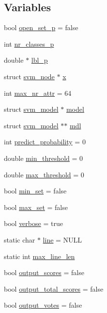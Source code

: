 \subsection*{Variables}
\begin{DoxyCompactItemize}
\item 
bool \hyperlink{svm-predict-old_8cpp_af292311da2955e8e2dd274443d57ee3a}{open\-\_\-set\-\_\-p} = false
\item 
int \hyperlink{svm-predict-old_8cpp_a7f5f60f72ac3c9c0dfe1c1873dff770f}{nr\-\_\-classes\-\_\-p}
\item 
double $\ast$ \hyperlink{svm-predict-old_8cpp_a34e7d19a381f7dfe28c6de7f93295bbc}{lbl\-\_\-p}
\item 
struct \hyperlink{structsvm__node}{svm\-\_\-node} $\ast$ \hyperlink{svm-predict-old_8cpp_a9a5b72a4065074cac5da07efb80a1e79}{x}
\item 
int \hyperlink{svm-predict-old_8cpp_af95bde9162db2c5dd97e80795b3548ed}{max\-\_\-nr\-\_\-attr} = 64
\item 
struct \hyperlink{structsvm__model}{svm\-\_\-model} $\ast$ \hyperlink{svm-predict-old_8cpp_a50c87b127b14787341e9630f4f5c700a}{model}
\item 
struct \hyperlink{structsvm__model}{svm\-\_\-model} $\ast$$\ast$ \hyperlink{svm-predict-old_8cpp_a639aa8f86cbf6b9c5d43e0c5082e26ac}{mdl}
\item 
int \hyperlink{svm-predict-old_8cpp_a1501132f5226b295e5300d74da55a2b9}{predict\-\_\-probability} = 0
\item 
double \hyperlink{svm-predict-old_8cpp_a3670388207cf8d0f4f4c9237a1482057}{min\-\_\-threshold} = 0
\item 
double \hyperlink{svm-predict-old_8cpp_a9090dc0b930a5f9212a3b6f3e4b5c5ab}{max\-\_\-threshold} = 0
\item 
bool \hyperlink{svm-predict-old_8cpp_aa816fb83dd1b415e1339bb8ddd6cdabc}{min\-\_\-set} = false
\item 
bool \hyperlink{svm-predict-old_8cpp_acd0f485f4131af58e0bdb273316d3805}{max\-\_\-set} = false
\item 
bool \hyperlink{svm-predict-old_8cpp_ab3f078684998b83967d507d0f453f454}{verbose} = true
\item 
static char $\ast$ \hyperlink{svm-predict-old_8cpp_a8adb30f4f6669f927fd9232f686c637b}{line} = N\-U\-L\-L
\item 
static int \hyperlink{svm-predict-old_8cpp_acad24c15bee67d2026f56bc94a1188c7}{max\-\_\-line\-\_\-len}
\item 
bool \hyperlink{svm-predict-old_8cpp_a7ce2b5cbc37a137a91ecc0cf035faba7}{output\-\_\-scores} = false
\item 
bool \hyperlink{svm-predict-old_8cpp_aa63d504586762ed1e2b057a76018d0fd}{output\-\_\-total\-\_\-scores} = false
\item 
bool \hyperlink{svm-predict-old_8cpp_ac3602f56435c68a322553ed33804e5d1}{output\-\_\-votes} = false
\end{DoxyCompactItemize}


